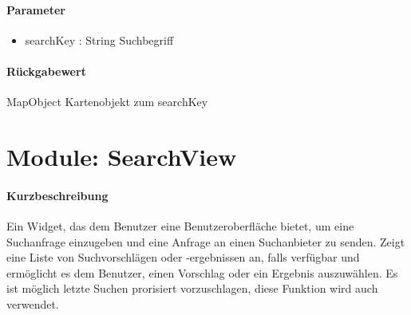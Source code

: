 \paragraph*{Parameter}
\begin{itemize}
    \item searchKey : String Suchbegriff
\end{itemize}
\paragraph*{Rückgabewert}
MapObject Kartenobjekt zum searchKey


\section{Module: SearchView}
\paragraph*{Kurzbeschreibung}
Ein Widget, das dem Benutzer eine Benutzeroberfläche bietet, um eine Suchanfrage einzugeben und eine Anfrage an einen Suchanbieter zu senden. 
Zeigt eine Liste von Suchvorschlägen oder -ergebnissen an, falls verfügbar 
und ermöglicht es dem Benutzer, einen Vorschlag oder ein Ergebnis auszuwählen.
Es ist möglich letzte Suchen prorisiert vorzuschlagen, diese Funktion wird auch verwendet.
